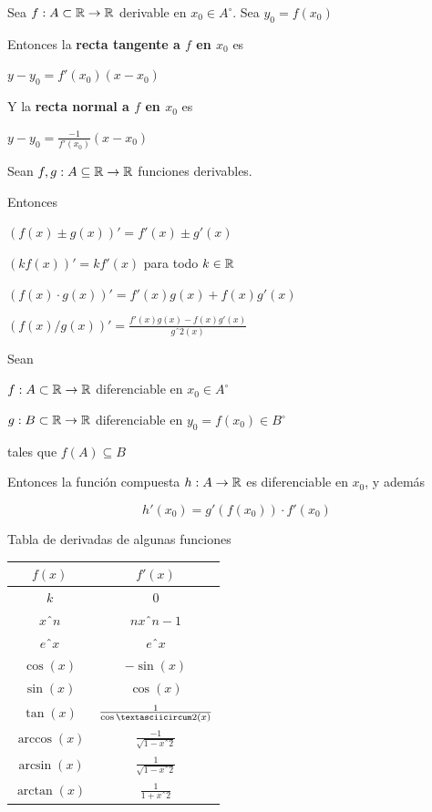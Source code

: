 \begin{definition}
Sea $f : A \subset \mathbb{R} \to \mathbb{R}$ derivable en $x_0 \in A^{\circ}$.  Sea $y_0 = f(x_0)$

Entonces la \textbf{recta tangente a $f$ en $x_0$} es

$ y - y_0 = f'(x_0) (x - x_0)$

Y la \textbf{recta normal a $f$ en $x_0$} es

$ y - y_0 = \frac{-1}{f'(x_0)} (x - x_0)$
\end{definition}

\begin{observation}

Sean $f,g : A \subseteq \mathbb{R} \to \mathbb{R}$ funciones derivables.  

Entonces

$(f(x) \pm g(x))' = f'(x) \pm g'(x)$

$(k f(x))' = k f'(x) $ para todo $k \in \mathbb{R}$

$(f(x) \cdot g(x))' = f'(x) g(x) + f(x) g'(x)$

$(f(x) / g(x))' = \frac{ f'(x) g(x) - f(x) g'(x) }{ gˆ2(x) }$
\end{observation}

\begin{theorem} \label{regla_cadena} 

Sean

$ f : A \subset \mathbb{R} \to \mathbb{R}$ diferenciable en $x_0 \in A^{\circ}$

$ g : B \subset \mathbb{R} \to \mathbb{R}$ diferenciable en $y_0 = f(x_0) \in B^{\circ}$

tales que $f(A) \subseteq B$

Entonces la función compuesta $h : A \to \mathbb{R}$ es diferenciable en $x_0$, y además 

$$ h'(x_0) = g'(f(x_0)) \cdot f'(x_0) $$
\end{theorem} 

Tabla de derivadas de algunas funciones

\begin{center}
\begin{tabular}{|c|c|}
\hline
$f(x)$ & $f'(x)$ \\
\hline
$k$ & $0$ \\
\hline
$xˆn$ & $n xˆ{n-1}$ \\
\hline
$eˆx$ & $eˆx$ \\
\hline
$\cos(x)$ & $-\sin(x)$ \\
\hline
$\sin(x)$ & $\cos(x)$ \\
\hline
$\tan(x)$ & $\frac{1}{\cosˆ2(x)}$ \\
\hline
$\arccos(x)$ & $\frac{-1}{ \sqrt{1 - xˆ2} }$ \\
\hline
$\arcsin(x)$ & $\frac{1}{ \sqrt{1 - xˆ2} }$ \\
\hline
$\arctan(x)$ & $\frac{1}{1 + xˆ2}$ \\
\hline
\end{tabular}
\end{center}

